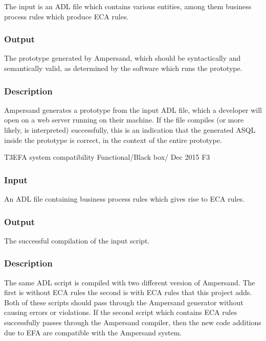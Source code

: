 \documentclass[12pt]{report}
\begin{document}
The input is an ADL file which contains various entities, among them business
process rules which produce ECA rules.

\vspace{-12pt}\subsubsection*{Output}

The prototype generated by Ampersand, which should be syntactically and
semantically valid, as determined by the software which runs the prototype.

\vspace{-12pt}\subsubsection*{Description}

Ampersand generates a prototype from the input ADL file, which a developer will
open on a web server running on their machine. If the file compiles (or more
likely, is interpreted) successfully, this is an indication that the generated
ASQL inside the prototype is correct, in the context of the entire prototype. 



\systemTest
{T3}{EFA system compatibility}
{Functional/Black box/ }
{Dec 2015}
{F3}
\vspace{-12pt}\subsubsection*{Input}
An ADL file containing business process rules which gives rise to ECA rules. 
	
\vspace{-12pt}\subsubsection*{Output}
The successful compilation of the input script.
	
\vspace{-12pt}\subsubsection*{Description}
The same ADL script is compiled with two different version of Ampersand.  The
first is without ECA rules the second is with ECA rules that this project
adds. Both of these scripts should pass through the Ampersand generator without
causing errors or violations. If the second script which contains ECA rules
successfully passes through the Ampersand compiler, then the new code additions
due to EFA are compatible with the Ampersand system.
\end{document}
